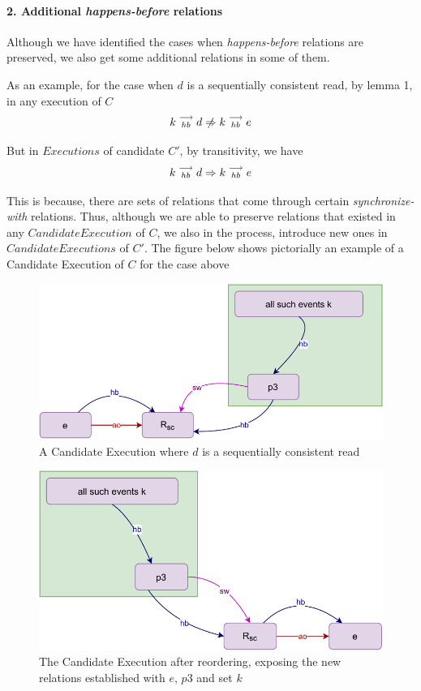 
\paragraph{2. Additional \textit{happens-before} relations}
    Although we have identified the cases when \textit{happens-before} relations are preserved, we also get some additional relations in some of them.

    As an example, for the case when $d$ is a sequentially consistent read, by lemma 1, in any execution of $C$
    \[
        \reln{k}{hb}{d} \centernot\Rightarrow \reln{k}{hb}{e} 
    \]

    But in $Executions$ of candidate $C'$, by transitivity, we have 
    \[
        k\stackrel{\longrightarrow}{_{hb}}d \Rightarrow k\stackrel{\longrightarrow}{_{hb}}e 
    \]

    This is because, there are sets of relations that come through certain \textit{synchronize-with} relations. Thus, although we are able to preserve relations that existed in any $Candidate Execution$ of $C$, we also in the process, introduce new ones in $Candidate Executions$ of $C'$. The figure below shows pictorially an example of a Candidate Execution of $C$ for the case above 

    \begin{figure}[H]
        \centering
        \includegraphics[scale=0.7]{Q2(c).pdf}
        \caption{A Candidate Execution where $d$ is a sequentially consistent read}
        \label{fig:my_label}
    \end{figure}

    \begin{figure}[H]
        \centering
        \includegraphics[scale=0.7]{Q2(d).pdf}
        \caption{The Candidate Execution after reordering, exposing the new relations established with $e$, $p3$ and set $k$}
        \label{fig:my_label}
    \end{figure}


